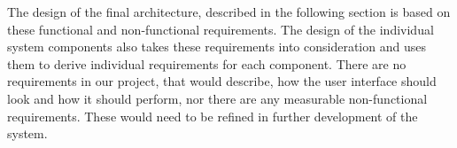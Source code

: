 The design of the final architecture, described in the following section is based on these functional and non-functional requirements. The design of the individual system components also takes these requirements into consideration and uses them to derive individual requirements for each component. There are no requirements in our project, that would describe, how the user interface should look and how it should perform, nor there are any measurable non-functional requirements. These would need to be refined in further development of the system.